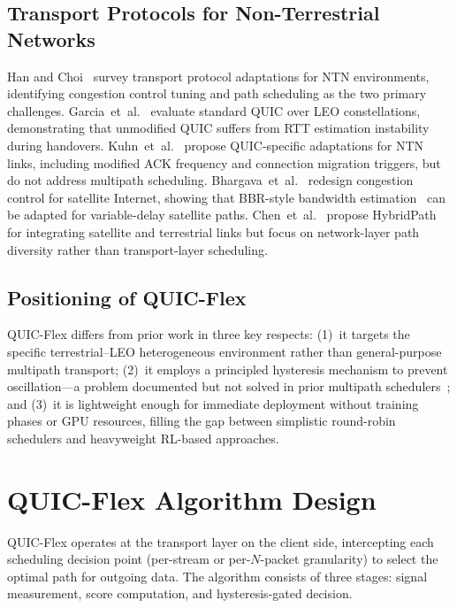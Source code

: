 \documentclass[conference,10pt]{IEEEtran}
\begin{document}
\subsection{Transport Protocols for Non-Terrestrial Networks}

Han and Choi~\cite{han2025leo} survey transport protocol adaptations for NTN environments, identifying congestion control tuning and path scheduling as the two primary challenges.
Garcia~et~al.~\cite{garcia2025quicsat} evaluate standard QUIC over LEO constellations, demonstrating that unmodified QUIC suffers from RTT estimation instability during handovers.
Kuhn~et~al.~\cite{kuhn2025quicntn} propose QUIC-specific adaptations for NTN links, including modified ACK frequency and connection migration triggers, but do not address multipath scheduling.
Bhargava~et~al.~\cite{bhargava2025congestion} redesign congestion control for satellite Internet, showing that BBR-style bandwidth estimation~\cite{wu2025bbr3} can be adapted for variable-delay satellite paths.
Chen~et~al.~\cite{chen2025hybridpath} propose HybridPath for integrating satellite and terrestrial links but focus on network-layer path diversity rather than transport-layer scheduling.

\subsection{Positioning of QUIC-Flex}

QUIC-Flex differs from prior work in three key respects: (1)~it targets the specific terrestrial--LEO heterogeneous environment rather than general-purpose multipath transport; (2)~it employs a principled hysteresis mechanism to prevent oscillation—a problem documented but not solved in prior multipath schedulers~\cite{pan2026scheduler}; and (3)~it is lightweight enough for immediate deployment without training phases or GPU resources, filling the gap between simplistic round-robin schedulers and heavyweight RL-based approaches.

\section{QUIC-Flex Algorithm Design}
\label{sec:design}

QUIC-Flex operates at the transport layer on the client side, intercepting each scheduling decision point (per-stream or per-$N$-packet granularity) to select the optimal path for outgoing data.
The algorithm consists of three stages: signal measurement, score computation, and hysteresis-gated decision.
\end{document}
